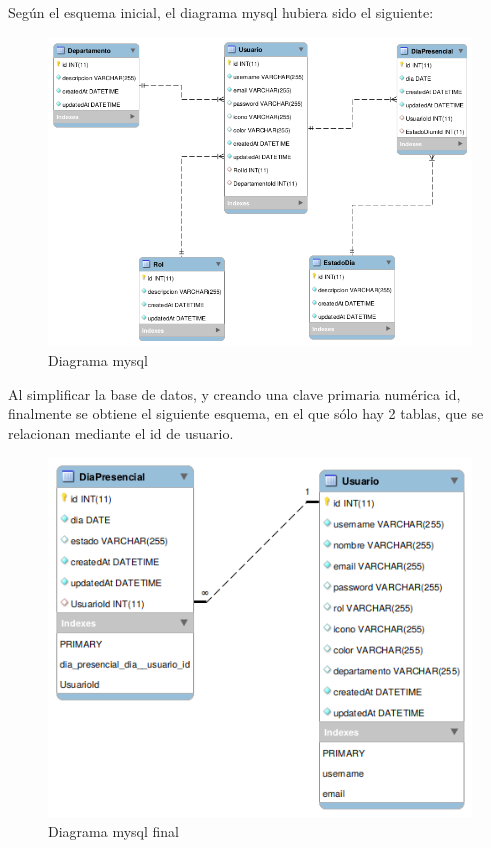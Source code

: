 \documentclass[11pt,spanish,listoffigures,listoftables]{tfgetsinf}
\begin{document}
Según el esquema inicial, el diagrama mysql hubiera sido el siguiente:
\begin{figure}[h!] %
  \centering
   \includegraphics[scale=0.40]{img/EsquemaBBDD.png}
   \caption{Diagrama mysql}
   \label{fig:diagramaMysql}
 \end{figure}

 Al simplificar la base de datos, y creando una clave primaria numérica id, finalmente se obtiene el siguiente esquema, en el que sólo hay 2 tablas, que se relacionan mediante el id de usuario. 
 \begin{figure}[h!] %
  \centering
  \includegraphics[scale=0.40]{img/nuevaBBDD.png}
  \caption{Diagrama mysql final}
  \label{fig:nuevodiagramaMysql}
\end{figure}
\clearpage 
\end{document}
